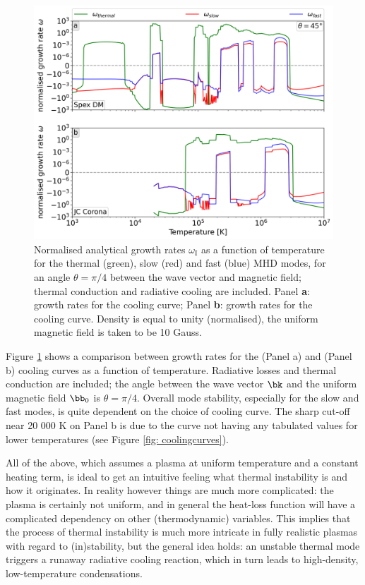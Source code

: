 \begin{figure}[t]
  \centering
  \includegraphics[width=\textwidth]{coolcurve_comparison.png}
  \caption{
    Normalised analytical growth rates $\omega_\text{I}$ as a function of temperature for the thermal (green), slow (red) and fast (blue) MHD modes, for an angle $\theta = \pi/4$ between the wave vector and magnetic field; thermal conduction and radiative cooling are included. Panel \textbf{a}: growth rates for the {\spexdm} cooling curve; Panel \textbf{b}: growth rates for the {\jccorona} cooling curve. Density is equal to unity (normalised), the uniform magnetic field is taken to be 10 Gauss.
  }
  \label{fig: coolcurve_comparison}
\end{figure}

Figure \ref{fig: coolcurve_comparison} shows a comparison between growth rates for the {\spexdm} (Panel a) and {\jccorona} (Panel b) cooling curves as a function of temperature. Radiative losses and thermal conduction are included; the angle between the wave vector $\bk$ and the uniform magnetic field $\bb_0$ is $\theta = \pi/4$. Overall mode stability, especially for the slow and fast modes, is quite dependent on the choice of cooling curve. The sharp cut-off near 20 000 K on Panel b is due to the {\jccorona} curve not having any tabulated values for lower temperatures (see Figure \ref{fig: coolingcurves}).

All of the above, which assumes a plasma at uniform temperature and a constant heating term, is ideal to get an intuitive feeling what thermal instability is and how it originates. In reality however things are much more complicated: the plasma is certainly not uniform, and in general the heat-loss function will have a complicated dependency on other (thermodynamic) variables. This implies that the process of thermal instability is much more intricate in fully realistic plasmas with regard to (in)stability, but the general idea holds: an unstable thermal mode triggers a runaway radiative cooling reaction, which in turn leads to high-density, low-temperature condensations.


